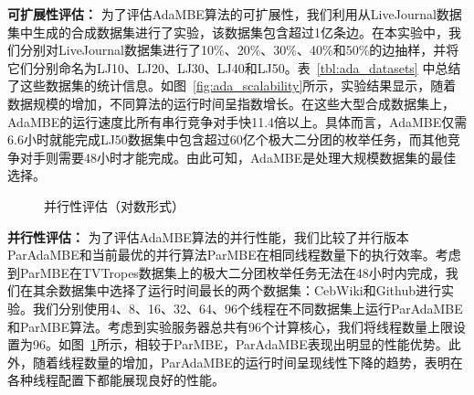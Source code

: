 \textbf{可扩展性评估：} 为了评估AdaMBE算法的可扩展性，我们利用从LiveJournal数据集中生成的合成数据集进行了实验，该数据集包含超过1亿条边。在本实验中，我们分别对LiveJournal数据集进行了10\%、20\%、30\%、40\%和50\%的边抽样，并将它们分别命名为LJ10、LJ20、LJ30、LJ40和LJ50。表~\ref{tbl:ada_datasets} 中总结了这些数据集的统计信息。如图~\ref{fig:ada_scalability}所示，实验结果显示，随着数据规模的增加，不同算法的运行时间呈指数增长。在这些大型合成数据集上，AdaMBE的运行速度比所有串行竞争对手快11.4倍以上。具体而言，AdaMBE仅需6.6小时就能完成LJ50数据集中包含超过60亿个极大二分团的枚举任务，而其他竞争对手则需要48小时才能完成。由此可知，AdaMBE是处理大规模数据集的最佳选择。

\begin{figure} [H]
	\centering

  \quad

	\caption{并行性评估（对数形式）}
	\label{fig:ada_parallel}

\end{figure}

\textbf{并行性评估：} 为了评估AdaMBE算法的并行性能，我们比较了并行版本ParAdaMBE和当前最优的并行算法ParMBE在相同线程数量下的执行效率。考虑到ParMBE在TVTropes数据集上的极大二分团枚举任务无法在48小时内完成，我们在其余数据集中选择了运行时间最长的两个数据集：CebWiki和Github进行实验。我们分别使用4、8、16、32、64、96个线程在不同数据集上运行ParAdaMBE和ParMBE算法。考虑到实验服务器总共有96个计算核心，我们将线程数量上限设置为96。如图~\ref{fig:ada_parallel}所示，相较于ParMBE，ParAdaMBE表现出明显的性能优势。此外，随着线程数量的增加，ParAdaMBE的运行时间呈现线性下降的趋势，表明在各种线程配置下都能展现良好的性能。




